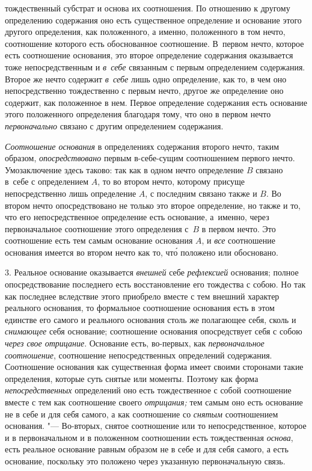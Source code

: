 тождественный субстрат и основа их соотношения. По отношению к другому
определению содержания оно есть существенное определение и основание этого
другого определения, как положенного, а именно, положенного в том нечто,
соотношение которого есть обоснованное соотношение. В~первом нечто, которое
есть соотношение основания, это второе определение содержания оказывается
тоже непосредственным и {\em в~себе} связанным с первым
определением содержания. Второе же нечто содержит
{\em в~себе} лишь одно определение, как то, в чем оно
непосредственно тождественно с первым нечто, другое же определение оно
содержит, как положенное в нем. Первое определение содержания есть
основание этого положенного определения благодаря тому, что оно в первом
нечто {\em первоначально} связано с другим определением
содержания.

{\em Соотношение основания} в определениях содержания
второго нечто, таким образом, {\em опосредствовано}
первым в-себе-сущим соотношением первого нечто. Умозаключение здесь таково:
так как в одном нечто определение $B$ связано в~себе
с определением $A$, то во втором нечто,
которому присуще непосредственно лишь определение
$A$, с последним связано также и
$B$. Во втором нечто опосредствовано не только это
второе определение, но также и то, что его непосредственное определение
есть основание, а~именно, через первоначальное соотношение этого
определения с~$B$ в первом нечто. Это соотношение
есть тем самым основание основания $A$, и
{\em все} соотношение основания имеется во втором нечто
как то, чт\'{о} положено или обосновано.

3. Реальное основание оказывается {\em внешней} себе
{\em рефлексией} основания; полное опосредствование
последнего есть восстановление его тождества с собою. Но так как последнее
вследствие этого приобрело вместе с тем внешний характер реального
основания, то формальное соотношение основания есть в этом единстве его
самого и реального основания столь же полагающее себя, сколь и
{\em снимающее} себя основание; соотношение основания
опосредствует себя с собою {\em через свое отрицание}.
Основание есть, во-первых, как {\em первоначальное соотношение},
соотношение непосредственных
определений содержания. Соотношение основания как существенная форма имеет
своими сторонами такие определения, которые суть снятые или моменты.
Поэтому как форма {\em непосредственных} определений
оно есть тождественное с собой соотношение вместе с тем как соотношение
своего {\em отрицания;} тем самым оно есть основание не
в себе и для себя самого, а как соотношение со
{\em снятым} соотношением основания. "--- Во-вторых,
снятое соотношение или то непосредственное, которое и в первоначальном и в
положенном соотношении есть тождественная {\em основа},
есть реальное основание равным образом не в себе и для себя самого, а есть
основание, поскольку это положено через указанную первоначальную связь.

